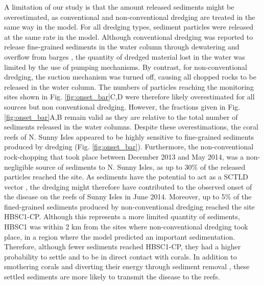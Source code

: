 \documentclass[preprint,12pt,authoryear]{elsarticle}
\begin{document}
A limitation of our study is that the amount released sediments might be overestimated, as conventional and non-conventional dredging are treated in the same way in the model. For all dredging types, sediment particles were released at the same rate in the model. Although conventional dredging was reported to release fine-grained sediments in the water column through dewatering and overflow from barges \citep{jones2016assessing}, the quantity of dredged material lost in the water was limited by the use of pumping mechanisms. By contrast, for non-conventional dredging, the suction mechanism was turned off, causing all chopped rocks to be released in the water column. The numbers of particles reaching the monitoring sites shown in Fig. \ref{fig:onset_bar}C,D were therefore likely overestimated for all sources but non conventional dredging. However, the fractions given in Fig. \ref{fig:onset_bar}A,B remain valid as they are relative to the total number of sediments released in the water columns. Despite these overestimations, the coral reefs of N. Sunny Isles appeared to be highly sensitive to fine-grained sediments produced by dredging (Fig. \ref{fig:onset_bar}). Furthermore, the non-conventional rock-chopping that took place between December 2013 and May 2014, was a non-negligible source of sediments to N. Sunny Isles, as up to 30\% of the released particles reached the site. As sediments have the potential to act as a SCTLD vector \citep{rosales2020rhodobacterales, studivan2022reef}, the dredging might therefore have contributed to the observed onset of the disease on the reefs of Sunny Isles in June 2014. Moreover, up to 5\% of the fined-grained sediments produced by non-conventional dredging reached the site HBSC1-CP. Although this represents a more limited quantity of sediments, HBSC1 was within 2 km from the sites where non-conventional dredging took place, in a region where the model predicted an important sedimentation. Therefore, although fewer sediments reached HBSC1-CP, they had a higher probability to settle and to be in direct contact with corals. In addition to smothering corals and diverting their energy through sediment removal \citep{erftemeijer2012environmental}, these settled sediments are more likely to transmit the disease to the reefs.
\end{document}
